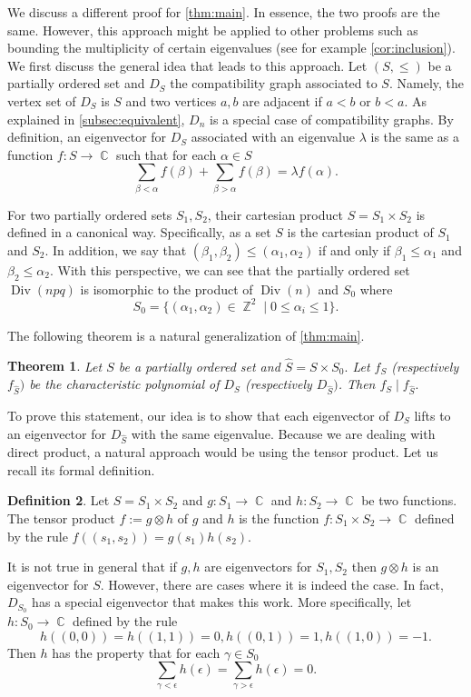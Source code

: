 \documentclass[11pt,a4paper]{amsart}
\newtheorem{thm}{Theorem}[section]
\theoremstyle{definition}
\newtheorem{definition}[thm]{Definition}
\DeclareMathOperator{\C}{\mathbb{C}}
\DeclareMathOperator{\Z}{\mathbb{Z}}
\DeclareMathOperator{\Div}{\text{Div}}
\numberwithin{equation}{section}
\begin{document}
We discuss a different proof for \cref{thm:main}. In essence, the two proofs are the same. However, this approach might be applied to other problems such as bounding the multiplicity of certain eigenvalues (see for example \cref{cor:inclusion}). We first discuss the general idea that leads to this approach. Let $(S, \leq) $ be a partially ordered set and $D_{S}$ the compatibility graph associated to $S.$ Namely, the vertex set of $D_S$ is $S$ and two vertices $a, b$ are adjacent if $a<b$ or $b<a.$ As explained in \cref{subsec:equivalent}, $D_n$ is a special case of compatibility graphs. By definition, an eigenvector for $D_S$ associated with an eigenvalue $\lambda$ is the same as a function $f: S \to \C$ such that for each $\alpha \in S$ 
\[ \sum_{\beta < \alpha} f(\beta) + \sum_{\beta > \alpha} f(\beta) = \lambda f(\alpha). \]

For two partially ordered sets $S_1, S_2$, their cartesian product $S = S_1 \times S_2$ is defined in a canonical way. Specifically, as a set $S$ is the cartesian product of $S_1$ and $S_2$. In addition, we say that $(\beta_1, \beta_2) \leq (\alpha_1, \alpha_2)$ if and only if $\beta_1 \leq \alpha_1$ and $\beta_2 \leq \alpha_2.$ With this perspective, we can see that the partially ordered set $\Div(npq)$ is isomorphic to the product of $\Div(n)$ and $S_0$ where 
\[ S_0 =  \{(\alpha_1, \alpha_2) \in \Z^{2} \mid 0 \leq \alpha_i \leq 1 \} .\] 

The following theorem is a natural generalization of \cref{thm:main}.
\begin{thm} \label{thm:second_proof}
    Let $S$ be a partially ordered set and $\widehat{S}= S \times S_0.$ Let $f_{S}$ (respectively $f_{\widehat{S}})$ be the characteristic polynomial of $D_{S}$ (respectively $D_{\hat{S}})$. Then $f_{S} \mid f_{\widehat{S}}.$
\end{thm}
To prove this statement, our idea is to show that each eigenvector of $D_{S}$ lifts to an eigenvector for $D_{\widehat{S}}$ with the same eigenvalue. Because we are dealing with direct product, a natural approach would be using the tensor product. Let us recall its formal definition. 
\begin{definition} \label{def:tensor}
Let $S=S_1 \times S_2$ and $g: S_1 \to \C$ and $h:S_2 \to \C$ be two functions. The tensor product $f:=g \otimes h$ of $g$ and $h$ is the function $f: S_1 \times S_2 \to \C$ defined by the rule $f((s_1, s_2))= g(s_1)h(s_2).$
\end{definition}
It is not true in general that if $g, h$ are eigenvectors for $S_1, S_2$ then $g \otimes h$ is an eigenvector for $S.$ However, there are cases where it is indeed the case. In fact, $D_{S_0}$ has a special eigenvector that makes this work. More specifically, let $h: S_0 \to \C$ defined by the rule 
\[ h((0,0))=h((1,1))=0, h((0,1))=1, h((1,0))=-1.\]
Then $h$ has the property that for each $\gamma \in S_0$ 
\[ \sum_{\gamma<\epsilon} h(\epsilon) = \sum_{\gamma>\epsilon} h(\epsilon)=0. \]
\end{document}
